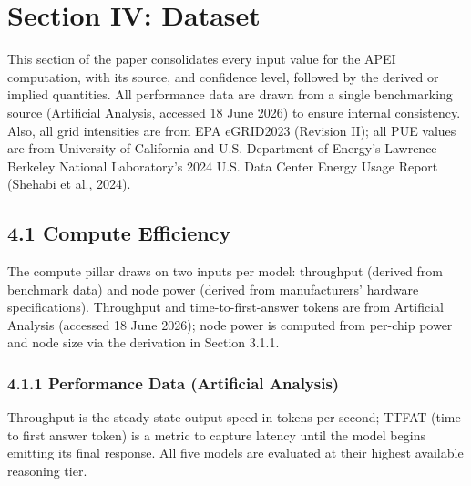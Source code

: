 \documentclass[11pt]{article}
\begin{document}
\section*{Section IV: Dataset}

This section of the paper consolidates every input value for the APEI computation, with its source, and confidence level, followed by the derived or implied quantities. All performance data are drawn from a single benchmarking source (Artificial Analysis, accessed 18 June 2026) to ensure internal consistency. Also, all grid intensities are from EPA eGRID2023 (Revision II); all PUE values are from University of California and U.S. Department of Energy's Lawrence Berkeley National Laboratory's 2024 U.S. Data Center Energy Usage Report (Shehabi et al., 2024).

\subsection*{4.1 Compute Efficiency}

The compute pillar draws on two inputs per model: throughput (derived from benchmark data) and node power (derived from manufacturers' hardware specifications). Throughput and time-to-first-answer tokens are from Artificial Analysis (accessed 18 June 2026); node power is computed from per-chip power and node size via the derivation in Section 3.1.1.

\subsubsection*{4.1.1 Performance Data (Artificial Analysis)}

Throughput is the steady-state output speed in tokens per second; TTFAT (time to first answer token) is a metric to capture latency until the model begins emitting its final response. All five models are evaluated at their highest available reasoning tier.
\end{document}
